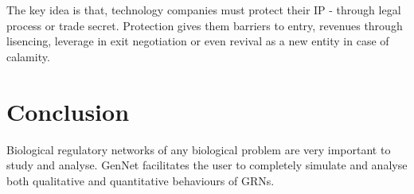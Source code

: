 \documentclass[twocolumn]{bmcart}%
\begin{document}
\par The key idea is that, technology companies must protect their IP - through legal process or trade secret. Protection gives them barriers to entry, revenues through lisencing, leverage in exit negotiation or even revival as a new entity in case of calamity.
      
\section*{Conclusion}
Biological regulatory networks of any biological problem are very important to study and analyse. GenNet facilitates the user to completely simulate and analyse both qualitative and quantitative behaviours of GRNs.


\begin{backmatter}

\nocite{*}

\end{backmatter}
\end{document}
